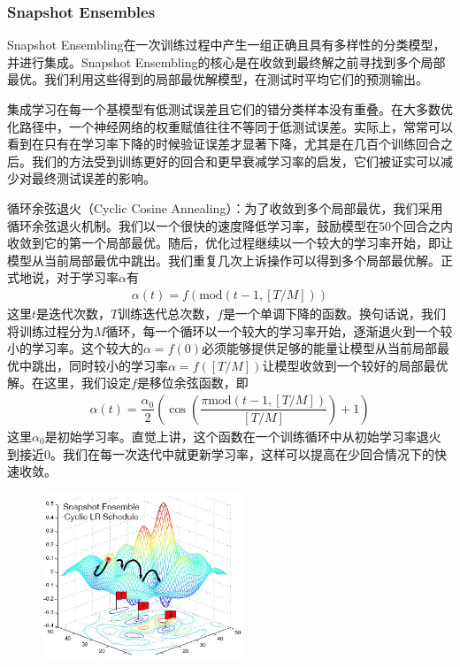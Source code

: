 \documentclass[supercite]{HustGraduPaper}
\begin{document}
\begin{sloppypar}
  \subsubsection{Snapshot Ensembles}
  Snapshot Ensembling\cite{DBLP:journals/corr/HuangLPLHW17}在一次训练过程中产生一组正确且具有多样性的分类模型，并进行集成。Snapshot Ensembling的核心是在收敛到最终解之前寻找到多个局部最优。我们利用这些得到的局部最优解模型，在测试时平均它们的预测输出。

  集成学习在每一个基模型有低测试误差且它们的错分类样本没有重叠。在大多数优化路径中，一个神经网络的权重赋值往往不等同于低测试误差。实际上，常常可以看到在只有在学习率下降的时候验证误差才显著下降，尤其是在几百个训练回合之后。我们的方法受到训练更好的回合和更早衰减学习率的启发，它们被证实可以减少对最终测试误差的影响。

  循环余弦退火（Cyclic Cosine Annealing）：为了收敛到多个局部最优，我们采用循环余弦退火机制。我们以一个很快的速度降低学习率，鼓励模型在50个回合之内收敛到它的第一个局部最优。随后，优化过程继续以一个较大的学习率开始，即让模型从当前局部最优中跳出。我们重复几次上诉操作可以得到多个局部最优解。正式地说，对于学习率$\alpha$有\begin{gather}
    \alpha(t)=f(\text{mod}(t-1,[T/M]))
  \end{gather}
  这里$t$是迭代次数，$T$训练迭代总次数，$f$是一个单调下降的函数。换句话说，我们将训练过程分为$M$循环，每一个循环以一个较大的学习率开始，逐渐退火到一个较小的学习率。这个较大的$\alpha=f(0)$必须能够提供足够的能量让模型从当前局部最优中跳出，同时较小的学习率$\alpha=f([T/M])$让模型收敛到一个较好的局部最优解。在这里，我们设定$f$是移位余弦函数，即\begin{gather}
     \alpha(t)=\dfrac{\alpha_0}{2}\left( \cos\left( \dfrac{\pi\text{mod}(t-1,[T/M])}{[T/M]} \right)+1 \right)
  \end{gather}
  这里$\alpha_0$是初始学习率。直觉上讲，这个函数在一个训练循环中从初始学习率退火到接近0。我们在每一次迭代中就更新学习率，这样可以提高在少回合情况下的快速收敛。\begin{figure}[H]
    \setlength{\abovecaptionskip}{0.2cm}
    \setlength{\belowcaptionskip}{-0.2cm}
    \centering%
      {\includegraphics[height=5cm]{16.jpg}}%

\end{figure}
\end{sloppypar}
\end{document}
